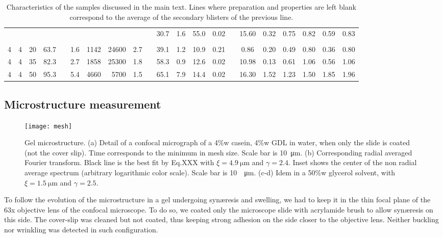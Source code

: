 \documentclass[twocolumn,superscriptaddress,showpacs,preprintnumbers,amsmath,amssymb,prl]{revtex4-1}
\begin{document}
\begin{table*}
\begin{tabular}{SSSScSrrScSSSScSSSSSS}
& & & && & & & && 30.7 & 1.6 & 55.0 & 0.02 && 15.60 & 0.32 & 0.75 & 0.82 & 0.59 & 0.83 \\
   \\[-2ex]
4 & 4 & 20 & 63.7 && 1.6 & 1142 & 24600 & 2.7 && 39.1 & 1.2 & 10.9 & 0.21 && 0.86 & 0.20 & 0.49 & 0.80 & 0.36 & 0.80 \\ 
4 & 4 & 35 & 82.3 && 2.7 & 1858 & 25300 & 1.8 && 58.3 & 0.9 & 12.6 & 0.02 && 10.98 & 0.13 & 0.61 & 1.06 & 0.56 & 1.06 \\ 
4 & 4 & 50 & 95.3 && 5.4 & 4660 & 5700 & 1.5 && 65.1 & 7.9 & 14.4 & 0.02 && 16.30 & 1.52 & 1.23 & 1.50 & 1.85 & 1.96 \\ 
\end{tabular}
\caption{Characteristics of the samples discussed in the main text. Lines where preparation and properties are left blank correspond to the average of the secondary blisters of the previous line.}
\label{tab:data}
\end{table*}

\subsection*{Microstructure measurement}

\begin{figure}
	\texttt{[image: mesh]}
	\caption{Gel microstructure. (a) Detail of a confocal micrograph of a 4\%w casein, 4\%w GDL in water, when only the slide is coated (not the cover slip). Time corresponds to the minimum in mesh size. Scale bar is \SI{10}{\micro\metre}. (b) Corresponding radial averaged Fourier transform. Black line is the best fit by Eq.XXX with $\xi=\SI{4.9}{\micro\metre}$ and $\gamma=2.4$. Inset shows the center of the non radial average spectrum (arbitrary logarithmic color scale). Scale bar is \SI{10}{\per\micro\metre}. (c-d) Idem in a 50\%w glycerol solvent, with $\xi=\SI{1.5}{\micro\metre}$ and $\gamma=2.5$.}
	\label{fig:mesh}
\end{figure}

To follow the evolution of the microstructure in a gel undergoing syn\ae{}resis and swelling, we had to keep it in the thin focal plane of the 63x objective lens of the confocal microscope. To do so, we coated only the microscope slide with acrylamide brush to allow syn\ae{}resis on this side. The cover-slip was cleaned but not coated, thus keeping strong adhesion on the side closer to the objective lens. Neither buckling nor wrinkling was detected in such configuration.
\end{document}
